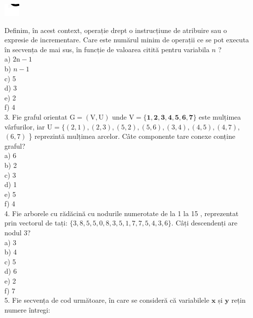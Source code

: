 \documentclass[10pt]{article}
\begin{document}
\begin{center}
\includegraphics[max width=\textwidth]{2025_04_17_46e04c6acd873ea9558dg-099}
\end{center}

Definim, în acest context, operație drept o instrucțiune de atribuire sau o expresie de incrementare. Care este numărul minim de operații ce se pot executa în secvența de mai sus, în funcție de valoarea citită pentru variabila $n$ ?\\
a) $2 \mathrm{n}-1$\\
b) $n-1$\\
c) 5\\
d) 3\\
e) 2\\
f) 4\\
3. Fie graful orientat $\mathrm{G}=(\mathrm{V}, \mathrm{U})$ unde $\mathrm{V}=\{\mathbf{1}, \mathbf{2}, \mathbf{3}, \mathbf{4}, \mathbf{5}, \mathbf{6}, \mathbf{7}\}$ este mulțimea vârfurilor, iar $\mathrm{U}=\{(2,1),(2,3),(5,2),(5,6),(3,4),(4,5),(4,7)$, $(6,7)$ \} reprezintă mulțimea arcelor. Câte componente tare conexe conține graful?\\
a) 6\\
b) 2\\
c) 3\\
d) 1\\
e) 5\\
f) 4\\
4. Fie arborele cu rădăcină cu nodurile numerotate de la 1 la 15 , reprezentat prin vectorul de tați: $\{3,8,5,5,0,8,3,5,1,7,7,5,4,3,6\}$. Câți descendenți are nodul 3?\\
a) 3\\
b) 4\\
c) 5\\
d) 6\\
e) 2\\
f) 7\\
5. Fie secvența de cod următoare, în care se consideră că variabilele $\mathbf{x}$ și $\mathbf{y}$ rețin numere întregi:
\end{document}

